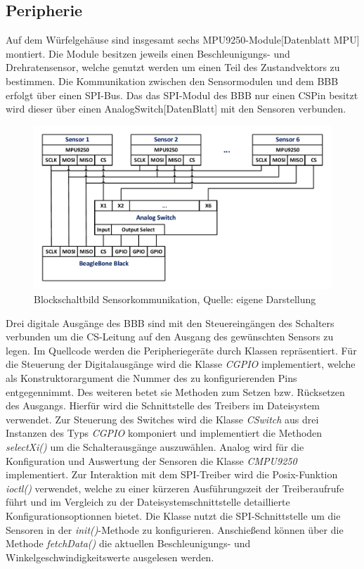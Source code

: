 \subsection{Peripherie}
Auf dem Würfelgehäuse sind insgesamt sechs MPU9250-Module[Datenblatt MPU] montiert. Die Module besitzen jeweils einen Beschleunigungs- und Drehratensensor, welche genutzt werden um einen Teil des Zustandvektors zu bestimmen. Die Kommunikation zwischen den Sensormodulen und dem \ac{BBB} erfolgt über einen \ac{SPI}-Bus. Das das \ac{SPI}-Modul des \ac{BBB} nur einen \ac{CS}Pin besitzt wird dieser über einen AnalogSwitch[DatenBlatt] mit den Sensoren verbunden.
\begin{figure}[!h]
\centering
\includegraphics[width=0.7\linewidth]{img/SW_0_Sensoren_BSB.pdf}
\caption{Blockschaltbild Sensorkommunikation, Quelle: eigene Darstellung}
\end{figure}
Drei digitale Ausgänge des \ac{BBB} sind mit den Steuereingängen des Schalters verbunden um die \ac{CS}-Leitung auf den Ausgang des gewünschten Sensors zu legen.
Im Quellcode werden die Peripheriegeräte durch Klassen repräsentiert. Für die Steuerung der Digitalausgänge wird die Klasse \textit{CGPIO} implementiert, welche als Konstruktorargument die Nummer des zu konfigurierenden Pins entgegennimmt. Des weiteren betet sie Methoden zum Setzen bzw. Rücksetzen des Ausgangs. Hierfür wird die Schnittstelle des Treibers im Dateisystem verwendet. Zur Steuerung des Switches wird die Klasse \textit{CSwitch} aus drei Instanzen des Typs \textit{CGPIO} komponiert und implementiert die Methoden \textit{selectXi()} um die Schalterausgänge auszuwählen.
Analog wird für die Konfiguration und Auswertung der Sensoren die Klasse \textit{CMPU9250} implementiert. Zur Interaktion mit dem \ac{SPI}-Treiber wird die Posix-Funktion \textit{ioctl()} verwendet, welche zu einer kürzeren Ausführungszeit der Treiberaufrufe führt und im Vergleich zu der Dateisystemschnittstelle detaillierte Konfigurationsoptionnen bietet. Die Klasse nutzt die \ac{SPI}-Schnittstelle um die Sensoren in der \textit{init()}-Methode zu konfigurieren. Anschießend können über die Methode \textit{fetchData()} die aktuellen Beschleunigungs- und Winkelgeschwindigkeitswerte ausgelesen werden.

